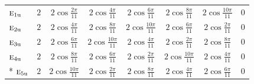 \documentclass[10pt,a4paper]{article}
\numberwithin{equation}{section}
\newcommand{\irr}[1]{\text{\normalfont\scshape #1}}
\newcommand{\ptag}[1]{\mathrm{#1}}
\begin{document}
{{\begin{longtable}{@{}lccccccc@{}}
$\irr{e}_{1\ptag{u}}$ & $2$ & $2\cos\tfrac{2\pi}{11}$ & $2\cos\tfrac{4\pi}{11}$ & $2\cos\tfrac{6\pi}{11}$ & $2\cos\tfrac{8\pi}{11}$ & $2\cos\tfrac{10\pi}{11}$ & $0$\\
$\irr{e}_{2\ptag{u}}$ & $2$ & $2\cos\tfrac{4\pi}{11}$ & $2\cos\tfrac{8\pi}{11}$ & $2\cos\tfrac{10\pi}{11}$ & $2\cos\tfrac{6\pi}{11}$ & $2\cos\tfrac{2\pi}{11}$ & $0$\\
$\irr{e}_{3\ptag{u}}$ & $2$ & $2\cos\tfrac{6\pi}{11}$ & $2\cos\tfrac{10\pi}{11}$ & $2\cos\tfrac{4\pi}{11}$ & $2\cos\tfrac{2\pi}{11}$ & $2\cos\tfrac{8\pi}{11}$ & $0$\\
$\irr{e}_{4\ptag{u}}$ & $2$ & $2\cos\tfrac{8\pi}{11}$ & $2\cos\tfrac{6\pi}{11}$ & $2\cos\tfrac{2\pi}{11}$ & $2\cos\tfrac{10\pi}{11}$ & $2\cos\tfrac{4\pi}{11}$ & $0$\\*
$\irr{e}_{5\ptag{u}}$ & $2$ & $2\cos\tfrac{10\pi}{11}$ & $2\cos\tfrac{2\pi}{11}$ & $2\cos\tfrac{8\pi}{11}$ & $2\cos\tfrac{4\pi}{11}$ & $2\cos\tfrac{6\pi}{11}$ & $0$\\
\bottomrule\end{longtable}}}
\end{document}
